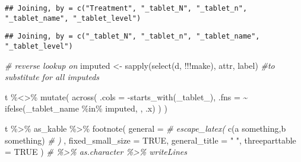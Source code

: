 \documentclass[
]{article}
\newenvironment{Shaded}{\begin{snugshade}}{\end{snugshade}}
\newcommand{\AttributeTok}[1]{\textcolor[rgb]{0.77,0.63,0.00}{#1}}
\newcommand{\CommentTok}[1]{\textcolor[rgb]{0.56,0.35,0.01}{\textit{#1}}}
\newcommand{\ConstantTok}[1]{\textcolor[rgb]{0.00,0.00,0.00}{#1}}
\newcommand{\FunctionTok}[1]{\textcolor[rgb]{0.00,0.00,0.00}{#1}}
\newcommand{\NormalTok}[1]{#1}
\newcommand{\OtherTok}[1]{\textcolor[rgb]{0.56,0.35,0.01}{#1}}
\newcommand{\SpecialCharTok}[1]{\textcolor[rgb]{0.00,0.00,0.00}{#1}}
\newcommand{\StringTok}[1]{\textcolor[rgb]{0.31,0.60,0.02}{#1}}
\begin{document}
\begin{verbatim}
## Joining, by = c("Treatment", "_tablet_N", "_tablet_n", "_tablet_name", "_tablet_level")
\end{verbatim}

\begin{verbatim}
## Joining, by = c("_tablet_N", "_tablet_n", "_tablet_name", "_tablet_level")
\end{verbatim}

\begin{Shaded}
\begin{Highlighting}[]
\CommentTok{\# reverse lookup on}
\NormalTok{imputed }\OtherTok{\textless{}{-}} \FunctionTok{sapply}\NormalTok{(}\FunctionTok{select}\NormalTok{(d, }\SpecialCharTok{!!!}\NormalTok{make), attr, }\StringTok{\textquotesingle{}label\textquotesingle{}}\NormalTok{)}
\CommentTok{\#to substitute \textquotesingle{}{-}\textquotesingle{} for all imputeds}

\NormalTok{t }\SpecialCharTok{\%\textless{}\textgreater{}\%} \FunctionTok{mutate}\NormalTok{(}
  \FunctionTok{across}\NormalTok{(}
    \AttributeTok{.cols =} \SpecialCharTok{{-}}\FunctionTok{starts\_with}\NormalTok{(}\StringTok{\textquotesingle{}\_tablet\_\textquotesingle{}}\NormalTok{),}
    \AttributeTok{.fns =} \SpecialCharTok{\textasciitilde{}} \FunctionTok{ifelse}\NormalTok{(}\StringTok{\textasciigrave{}}\AttributeTok{\_tablet\_name}\StringTok{\textasciigrave{}} \SpecialCharTok{\%in\%}\NormalTok{ imputed, }\StringTok{\textquotesingle{}{-}\textquotesingle{}}\NormalTok{, .x)}
\NormalTok{  )}
\NormalTok{)}

\NormalTok{t }\SpecialCharTok{\%\textgreater{}\%}
\NormalTok{  as\_kable }\SpecialCharTok{\%\textgreater{}\%}
  \FunctionTok{footnote}\NormalTok{(}
    \AttributeTok{general =} \CommentTok{\# escape\_latex(}
      \FunctionTok{c}\NormalTok{(}\StringTok{\textquotesingle{}a something\textquotesingle{}}\NormalTok{,}\StringTok{\textquotesingle{}b something\textquotesingle{}}\NormalTok{)}
      \CommentTok{\# )}
\NormalTok{    ,}
    \AttributeTok{fixed\_small\_size =} \ConstantTok{TRUE}\NormalTok{,}
    \AttributeTok{general\_title =} \StringTok{" "}\NormalTok{,}
    \AttributeTok{threeparttable =} \ConstantTok{TRUE}
\NormalTok{  ) }\CommentTok{\# \%\textgreater{}\% as.character \%\textgreater{}\% writeLines}
\end{Highlighting}
\end{Shaded}
\end{document}
